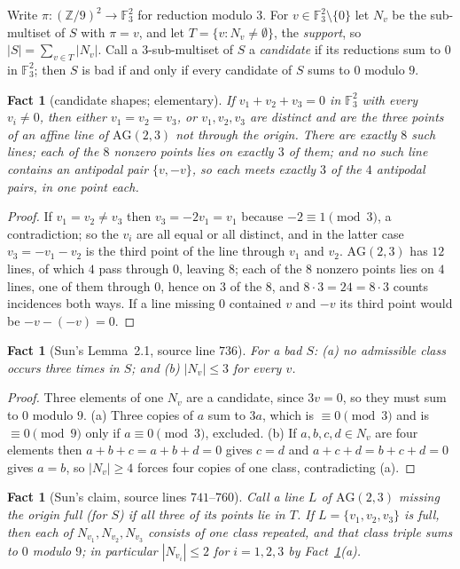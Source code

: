 \documentclass[11pt]{amsart}
\newtheorem{fact}[theorem]{Fact}
\newcommand{\ZZ}{\mathbb Z}
\newcommand{\FF}{\mathbb F}
\newcommand{\pio}{\pi}
\begin{document}
Write $\pio\colon(\ZZ/9)^2\to\FF_3^2$ for reduction modulo $3$. For
$v\in\FF_3^2\setminus\{0\}$ let $N_v$ be the sub-multiset of $S$ with
$\pio=v$, and let $T=\{v:N_v\ne\emptyset\}$, the \emph{support}, so
$|S|=\sum_{v\in T}|N_v|$. Call a $3$-sub-multiset of $S$ a \emph{candidate} if
its reductions sum to $0$ in $\FF_3^2$; then $S$ is bad if and only if every
candidate of $S$ sums to $0$ modulo $9$.

\begin{fact}[candidate shapes; elementary]\label{fact:1}
If $v_1+v_2+v_3=0$ in $\FF_3^2$ with every $v_i\ne0$, then either
$v_1=v_2=v_3$, or $v_1,v_2,v_3$ are distinct and are the three points of an
affine line of $\mathrm{AG}(2,3)$ not through the origin. There are exactly $8$
such lines; each of the $8$ nonzero points lies on exactly $3$ of them; and no
such line contains an antipodal pair $\{v,-v\}$, so each meets exactly $3$ of
the $4$ antipodal pairs, in one point each.
\end{fact}

\begin{proof}
If $v_1=v_2\ne v_3$ then $v_3=-2v_1=v_1$ because $-2\equiv1\pmod 3$, a
contradiction; so the $v_i$ are all equal or all distinct, and in the latter
case $v_3=-v_1-v_2$ is the third point of the line through $v_1$ and $v_2$.
$\mathrm{AG}(2,3)$ has $12$ lines, of which $4$ pass through $0$, leaving $8$;
each of the $8$ nonzero points lies on $4$ lines, one of them through $0$, hence
on $3$ of the $8$, and $8\cdot3=24=8\cdot3$ counts incidences both ways. If a
line missing $0$ contained $v$ and $-v$ its third point would be
$-v-(-v)=0$.
\end{proof}

\begin{fact}[Sun's Lemma~2.1, source line $736$]\label{fact:2}
For a bad $S$: \textup{(a)} no admissible class occurs three times in $S$; and
\textup{(b)} $|N_v|\le3$ for every $v$.
\end{fact}

\begin{proof}
Three elements of one $N_v$ are a candidate, since $3v=0$, so they must sum to
$0$ modulo $9$. (a) Three copies of $a$ sum to $3a$, which is $\equiv0\pmod3$
and is $\equiv0\pmod 9$ only if $a\equiv0\pmod3$, excluded. (b) If
$a,b,c,d\in N_v$ are four elements then $a+b+c=a+b+d=0$ gives $c=d$ and
$a+c+d=b+c+d=0$ gives $a=b$, so $|N_v|\ge4$ forces four copies of one class,
contradicting (a).
\end{proof}

\begin{fact}[Sun's claim, source lines $741$--$760$]\label{fact:3}
Call a line $L$ of $\mathrm{AG}(2,3)$ missing the origin \emph{full} (for $S$)
if all three of its points lie in $T$. If $L=\{v_1,v_2,v_3\}$ is full, then each
of $N_{v_1},N_{v_2},N_{v_3}$ consists of one class repeated, and that class
triple sums to $0$ modulo $9$; in particular $|N_{v_i}|\le2$ for $i=1,2,3$ by
Fact~\ref{fact:2}\textup{(a)}.
\end{fact}
\end{document}
